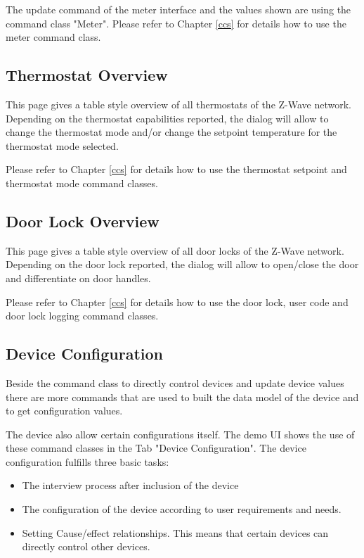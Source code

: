 The update command of the meter interface and the values shown are using the command class "Meter". Please refer to Chapter \ref{ccs} for details how to use the meter command class.

\subsection{Thermostat Overview}

This page gives a table style overview of all thermostats of the Z-Wave network.  
Depending on the thermostat capabilities reported, the dialog will allow to change the thermostat mode and/or change the setpoint temperature 
for the thermostat mode selected.
 
Please refer to Chapter \ref{ccs} for details how to use the thermostat setpoint and thermostat mode command classes.

\subsection{Door Lock Overview}

This page gives a table style overview of all door locks of the Z-Wave network.  
Depending on the door lock reported, the dialog will allow to open/close the door
and differentiate on door handles.
 
Please refer to Chapter \ref{ccs} for details how to use the door lock, user code
and door lock logging command classes.


 
 
\subsection{Device Configuration} 
 
Beside the command class to directly control devices and update device values there are more 
commands that are used to built the data model of the device and to get configuration values. 

The device also allow certain configurations itself. The demo UI shows the use of these command classes in the Tab "Device Configuration". The device configuration fulfills three basic tasks:

\begin{itemize}
\item The interview process after inclusion of the device
\item The configuration of the device according to user requirements and needs.
\item Setting Cause/effect relationships. This means that certain devices can directly control other devices.

\end{itemize}


